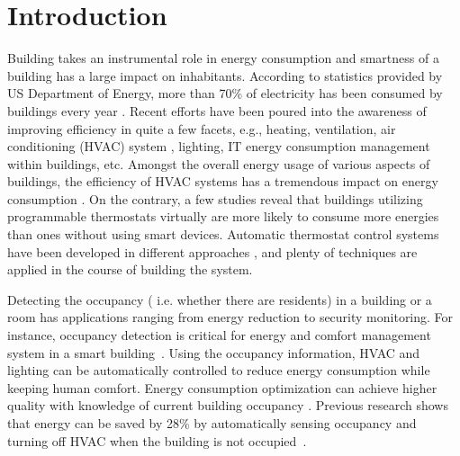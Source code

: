 \section{Introduction}
Building takes an instrumental role in energy consumption and smartness of a
building has a large impact on inhabitants. According to statistics provided by
US Department of Energy, more than 70\% of electricity has been consumed by
buildings every year \cite{doe_annual}. Recent efforts have been poured into the awareness of
improving efficiency in quite a few facets, e.g., heating, ventilation, air
conditioning (HVAC) system \cite{erickson2009energy}\cite{gao2009selfprog},
lighting\cite{delaney2009eval}, IT energy consumption management within
buildings\cite{agarwal2009augnet}\cite{agarwal2010sleep}, etc. Amongst the
overall energy usage of various aspects of buildings, the efficiency of HVAC
systems has a tremendous impact on energy consumption \cite{hobby2012analysis}.
On the contrary, a few studies \cite{bias1999elec} reveal that buildings
utilizing programmable thermostats virtually are more likely to consume more
energies than ones without using smart devices. Automatic thermostat control
systems have been developed in different approaches
\cite{thomas2012intelligent}\cite{lu2012eval}, and plenty of techniques are
applied in the course of building the system.

Detecting the occupancy ( i.e. whether there are residents) in a building or a
room has applications ranging from energy reduction to security monitoring. For
instance, occupancy detection is critical for energy and comfort management
system in a smart building~\cite{Nguyen2013Energy}.  Using the occupancy
information, HVAC and lighting can be automatically controlled to reduce energy
consumption while keeping human comfort. Energy consumption optimization can
achieve higher quality with knowledge of current building occupancy
\cite{majumdar2014energy}. Previous research shows that energy
can be saved by 28\% by automatically sensing occupancy and turning off HVAC
when the building is not occupied~\cite{Lu:SenSys10}.

